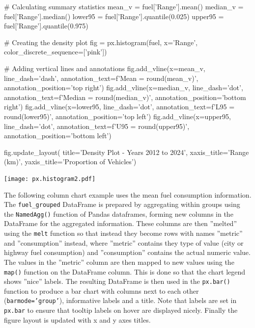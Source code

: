 \begin{samepage}
\begin{pythoncode}
# Calculating summary statistics
mean_v = fuel['Range'].mean()
median_v = fuel['Range'].median()
lower95 = fuel['Range'].quantile(0.025)
upper95 = fuel['Range'].quantile(0.975)

# Creating the density plot
fig = px.histogram(fuel, x='Range', 
         color_discrete_sequence=['pink'])

# Adding vertical lines and annotations
fig.add_vline(x=mean_v, line_dash='dash', 
      annotation_text=f'Mean = {round(mean_v)}', 
      annotation_position='top right')
fig.add_vline(x=median_v, line_dash='dot', 
      annotation_text=f'Median = {round(median_v)}', 
      annotation_position='bottom right')
fig.add_vline(x=lower95, line_dash='dot', 
      annotation_text=f'L95 = {round(lower95)}', 
      annotation_position='top left')
fig.add_vline(x=upper95, line_dash='dot', 
      annotation_text=f'U95 = {round(upper95)}', 
      annotation_position='bottom left')

fig.update_layout(
    title='Density Plot - Years 2012 to 2024',
    xaxis_title='Range (km)',
    yaxis_title='Proportion of Vehicles')
\end{pythoncode}
\end{samepage}

\begin{center}
    \texttt{[image: px.histogram2.pdf]}
\end{center}

The following column chart example uses the mean fuel consumption information. The \texttt{fuel\_grouped} DataFrame is prepared by aggregating within groups using the \texttt{NamedAgg()} function of Pandas dataframes, forming new columns in the DataFrame for the aggregated information. These columns are then ''melted'' using the \texttt{melt} function so that instead they become rows with names ''metric'' and ''consumption'' instead, where ''metric'' contains they type of value (city or highway fuel consumption) and ''consumption'' contains the actual numeric value.  The values in the ''metric'' column are then mapped to new values using the \texttt{map()} function on the DataFrame column. This is done so that the chart legend shows ''nice'' labels. The resulting DataFrame is then used in the \texttt{px.bar()} function to produce a bar chart with columns next to each other (\texttt{barmode='group'}), informative labels and a title. Note that labels are set in \texttt{px.bar} to ensure that tooltip labels on hover are displayed nicely. Finally the figure layout is updated with x and y axes titles.

